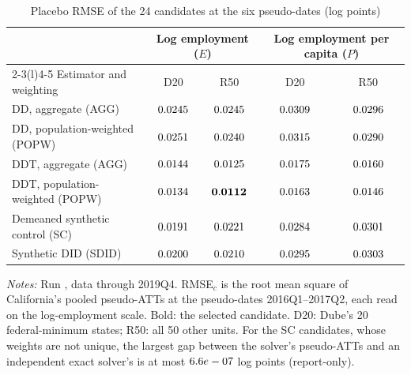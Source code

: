 \begin{table}[tbp]
\centering
\caption{Placebo RMSE of the 24 candidates at the six pseudo-dates (log points)}
\label{tab:rmse}
\small
\begin{tabular}{@{}lcccc@{}}
\toprule
& \multicolumn{2}{c}{Log employment ($E$)} & \multicolumn{2}{c}{Log employment per capita ($P$)} \\
\cmidrule(lr){2-3}\cmidrule(l){4-5}
Estimator and weighting & D20 & R50 & D20 & R50 \\
\midrule
DD, aggregate (AGG) & $0.0245$ & $0.0245$ & $0.0309$ & $0.0296$ \\
DD, population-weighted (POPW) & $0.0251$ & $0.0240$ & $0.0315$ & $0.0290$ \\
DDT, aggregate (AGG) & $0.0144$ & $0.0125$ & $0.0175$ & $0.0160$ \\
DDT, population-weighted (POPW) & $0.0134$ & $\mathbf{0.0112}$ & $0.0163$ & $0.0146$ \\
Demeaned synthetic control (SC) & $0.0191$ & $0.0221$ & $0.0284$ & $0.0301$ \\
Synthetic DID (SDID) & $0.0200$ & $0.0210$ & $0.0295$ & $0.0303$ \\
\bottomrule
\end{tabular}

\medskip
\begin{minipage}{\linewidth}\footnotesize
\emph{Notes:} Run , data through 2019Q4. RMSE$_c$ is the root mean square of
California's pooled pseudo-ATTs at the pseudo-dates 2016Q1--2017Q2, each read on the
log-employment scale. Bold: the selected candidate. D20: Dube's 20 federal-minimum states; R50:
all 50 other units. For the SC candidates, whose weights are not unique, the largest gap between
the solver's pseudo-ATTs and an independent exact solver's is at most $6.6e-07$ log
points (report-only).
\end{minipage}
\end{table}

